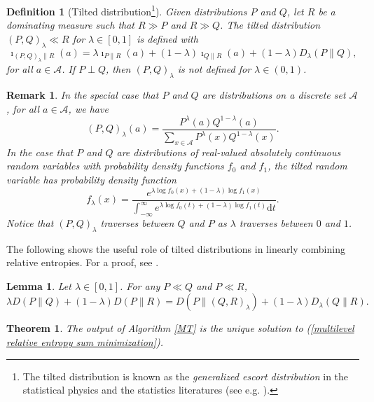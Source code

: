 \documentclass{article}
\newtheorem{definition}{Definition}
\newtheorem{remark}{Remark}
\newtheorem{theorem}{Theorem}
\newtheorem{lemma}{Lemma}
\begin{document}
\begin{definition}[Tilted distribution\footnote{The tilted distribution is known as the \emph{generalized escort distribution} in the statistical physics and the statistics literatures (see e.g. \cite{bercher2012simple}).}]\label{Tilted distribution definition} Given distributions $P$ and $Q$, let $R$ be a dominating measure such that $R \gg P$ and $R \gg Q$. The tilted distribution $(P,Q)_{\lambda}\ll R$ for $\lambda\in [0,1]$ is defined with 
\begin{equation}
	\imath_{(P,Q)_{\lambda}\|R}(a)=\lambda \imath_{P\|R}(a)+(1-\lambda)\imath_{Q\|R}(a)+(1-\lambda)D_{\lambda}(P\|Q),\nonumber
\end{equation}
for all $a\in\mathcal{A}$. If $P \perp Q$, then $(P,Q)_{\lambda}$ is not defined for $\lambda\in (0,1)$.
\end{definition}
\begin{remark}\normalfont
	In the special case that $P$ and $Q$ are distributions on a discrete set $\mathcal{A}$, for all $a\in \mathcal{A}$, we have
\begin{equation*}
	(P,Q)_{\lambda}(a)= \frac{P^{\lambda}(a)Q^{1-\lambda}(a)}{\sum_{x\in \mathcal{A}}P^{\lambda}(x)Q^{1-\lambda}(x)}.
\end{equation*}
 In the case that $P$ and $Q$ are distributions of real-valued absolutely continuous random variables with probability density functions $f_0$ and $f_1$, the tilted random variable has probability density function
 \begin{equation*}
 	f_{\lambda}(x)=\frac{e^{\lambda \log f_0(x)+(1-\lambda)\log f_1(x)}}{\int_{-\infty}^{\infty}e^{\lambda \log f_0(t)+(1-\lambda)\log f_1(t)}\mathrm{d}t}.
 \end{equation*}
 Notice that $(P,Q)_{\lambda}$ traverses between $Q$ and $P$ as $\lambda$ traverses between $0$ and $1$. 
\end{remark}
The following shows the useful role of tilted distributions in linearly combining relative entropies. For a proof, see \cite[Theorem 30]{van2014renyi}.
\begin{lemma}\label{Tilted Renyi lemma main}
Let $\lambda\in [0,1]$. For any $P \ll Q$ and $P\ll R$,
\begin{equation}
	\lambda D(P\|Q)+(1-\lambda)D(P\|R)=D\left(P\|(Q,R)_{\lambda}\right)+(1-\lambda)D_{\lambda}(Q\|R).\nonumber
\end{equation}	
\end{lemma}
\begin{theorem}\label{MT solution theorem}
	The output of Algorithm \ref{MT} is the unique solution to (\ref{multilevel relative entropy sum minimization}).
\end{theorem}
\end{document}
